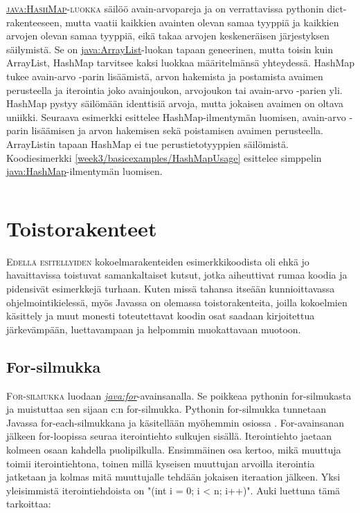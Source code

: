 \documentclass[openany]{book}
\newcommand{\newthought}[1]{\smallskip\textsc{#1}}
\newcommand{\java}[1]{\underline{\gls{java:#1}}}
\newcommand{\newjava}[1]{\textit{\java{#1}}}
\newcommand{\code}[3]{
	\begin{listing}
		\linespread{0.85}
		\inputminted{java}{OhjelmointiopasEsimerkit/src/#1/#2.java}
		\caption{#1: #3}
		\label{#1/#2}
	\end{listing}
}
\begin{document}
\newthought{\java{HashMap}-luokka} säilöö avain-arvopareja ja on verrattavissa pythonin
dict-rakenteeseen, mutta vaatii kaikkien avainten olevan samaa tyyppiä ja kaikkien arvojen olevan
samaa tyyppiä, eikä takaa arvojen keskeneräisen järjestyksen säilymistä. Se on 
\java{ArrayList}-luokan tapaan geneerinen, mutta toisin kuin ArrayList, HashMap tarvitsee kaksi
luokkaa määritelmänsä yhteydessä. HashMap tukee avain-arvo -parin lisäämistä, arvon hakemista ja
postamista avaimen perusteella ja iterointia joko avainjoukon, arvojoukon tai avain-arvo -parien
yli. HashMap pystyy säilömään identtisiä arvoja, mutta jokaisen avaimen on oltava uniikki.
Seuraava esimerkki esittelee HashMap-ilmentymän luomisen, avain-arvo -parin lisäämisen ja
arvon hakemisen sekä poistamisen avaimen perusteella. ArrayListin tapaan HashMap ei tue
perustietotyyppien säilömistä. Koodiesimerkki \ref{week3/basicexamples/HashMapUsage} esittelee
simppelin \java{HashMap}-ilmentymän luomisen.

\code{week3/basicexamples}{HashMapUsage}{\java{HashMap}-luokan käyttö Javassa}


\section{Toistorakenteet}
\label{loopeista}

\newthought{Edellä esitellyiden} kokoelmarakenteiden esimerkkikoodista oli ehkä jo havaittavissa
toistuvat samankaltaiset kutsut, jotka aiheuttivat rumaa koodia ja pidensivät esimerkkejä turhaan.
Kuten missä tahansa itseään kunnioittavassa ohjelmointikielessä, myös Javassa on olemassa
toistorakenteita, joilla kokoelmien käsittely ja muut monesti toteutettavat koodin osat saadaan
kirjoitettua järkevämpään, luettavampaan ja helpommin muokattavaan muotoon.

\subsection{For-silmukka}
\label{for}

\newthought{For-silmukka} luodaan \newjava{for}-avainsanalla. Se poikkeaa pythonin for-silmukasta
ja muistuttaa sen sijaan c:n for-silmukka. Pythonin for-silmukka tunnetaan Javassa
for-each-silmukkana ja käsitellään myöhemmin osiossa . For-avainsanan jälkeen
for-loopissa seuraa iterointiehto sulkujen sisällä. Iterointiehto jaetaan kolmeen osaan kahdella
puolipilkulla. Ensimmäinen osa kertoo, mikä muuttuja toimii iterointiehtona, toinen millä kyseisen
muuttujan arvoilla iterointia jatketaan ja kolmas mitä muuttujalle tehdään jokaisen iteraation
jälkeen. Yksi yleisimmistä iterointiehdoista on "(int i = 0; i < n; i++)". Auki luettuna tämä
tarkoittaa:
\end{document}
